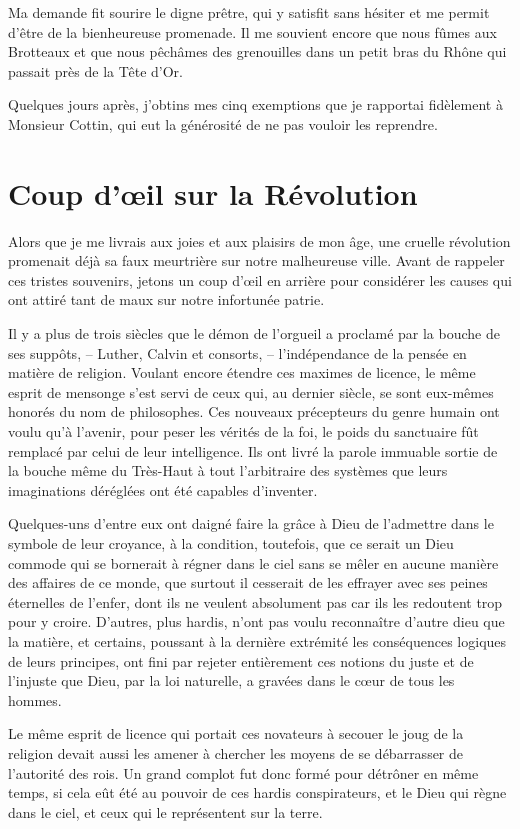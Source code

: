 \documentclass[11pt,a4paper]{report}
\begin{document}
Ma demande fit sourire le digne prêtre, qui y satisfit sans hésiter et me permit d'être de la bienheureuse promenade. Il me souvient encore que nous fûmes aux Brotteaux et que nous pêchâmes des grenouilles dans un petit bras du Rhône qui passait près de la Tête d'Or.

Quelques jours après, j'obtins mes cinq exemptions que je rapportai fidèlement à Monsieur Cottin, qui eut la générosité de ne pas vouloir les reprendre.

\section*{Coup d'œil sur la Révolution}

Alors que je me livrais aux joies et aux plaisirs de mon âge, une cruelle révolution promenait déjà sa faux meurtrière sur notre malheureuse ville. Avant de rappeler ces tristes souvenirs, jetons un coup d'œil en arrière pour considérer les causes qui ont attiré tant de maux sur notre infortunée patrie.

Il y a plus de trois siècles que le démon de l'orgueil a proclamé par la bouche de ses suppôts, -- Luther, Calvin et consorts, -- l'indépendance de la pensée en matière de religion. Voulant encore étendre ces maximes de licence, le même esprit de mensonge s'est servi de ceux qui, au dernier siècle, se sont eux-mêmes honorés du nom de philosophes. Ces nouveaux précepteurs du genre humain ont voulu qu'à l'avenir, pour peser les vérités de la foi, le poids du sanctuaire fût remplacé par celui de leur intelligence. Ils ont livré la parole immuable sortie de la bouche même du Très-Haut à tout l'arbitraire des systèmes que leurs imaginations déréglées ont été capables d'inventer.

Quelques-uns d'entre eux ont daigné faire la grâce à Dieu de l'admettre dans le symbole de leur croyance, à la condition, toutefois, que ce serait un Dieu commode qui se bornerait à régner dans le ciel sans se mêler en aucune manière des affaires de ce monde, que surtout il cesserait de les effrayer avec ses peines éternelles de l'enfer, dont ils ne veulent absolument pas car ils les redoutent trop pour y croire. D'autres, plus hardis, n'ont pas voulu reconnaître d'autre dieu que la matière, et certains, poussant à la dernière extrémité les conséquences logiques de leurs principes, ont fini par rejeter entièrement ces notions du juste et de l'injuste que Dieu, par la loi naturelle, a gravées dans le cœur de tous les hommes.

Le même esprit de licence qui portait ces novateurs à secouer le joug de la religion devait aussi les amener à chercher les moyens de se débarrasser de l'autorité des rois. Un grand complot fut donc formé pour détrôner en même temps, si cela eût été au pouvoir de ces hardis conspirateurs, et le Dieu qui règne dans le ciel, et ceux qui le représentent sur la terre.
\end{document}
